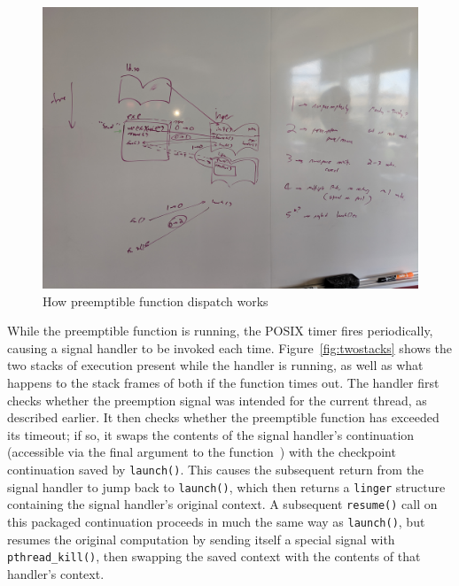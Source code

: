 \begin{figure}
\includegraphics[width=\columnwidth]{figs/calltree}
\caption{How preemptible function dispatch works}
\label{fig:callsimple}
\end{figure}

While the preemptible function is running, the POSIX timer fires periodically,
causing a signal handler to be invoked each time.  Figure~\ref{fig:twostacks} shows
the two stacks of execution present while the handler is running, as well as what
happens to the stack frames of both if the function times out.  The handler first
checks whether the preemption signal was intended for the current thread, as
described earlier.  It then checks whether the preemptible function has exceeded its
timeout; if so, it swaps the contents of the signal handler's continuation
(accessible via the final argument to the function~\cite{sigaction-manpage}) with the
checkpoint continuation saved by \texttt{launch()}.  This causes the subsequent
return from the signal handler to jump back to \texttt{launch()}, which then returns
a \texttt{linger} structure containing the signal handler's original context.  A
subsequent \texttt{resume()} call on this packaged continuation proceeds in much the
same way as \texttt{launch()}, but resumes the original computation by sending itself
a special signal with \texttt{pthread\_kill()}, then swapping the saved context with
the contents of that handler's context.

